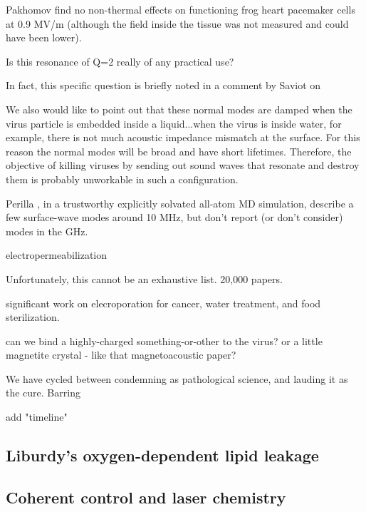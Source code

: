 \documentclass[paper.tex]{subfiles}
\begin{document}
\begin{multicols}{1}
Pakhomov \cite{Comparative} find no non-thermal effects on functioning frog heart pacemaker cells at 0.9 MV/m (although the field inside the tissue was not measured and could have been lower). 



Is this resonance of Q=2 really of any practical use?


In fact, this specific question is briefly noted in a comment by Saviot \cite{Comment2004} on 


\begin{fquote}
	We also would like to point out that these normal modes are damped when the virus particle is embedded inside a liquid...when the virus is inside water, for example, there is not much acoustic impedance mismatch at the surface. For this reason the normal modes will be broad and have short lifetimes. Therefore, the objective of killing viruses by sending out sound waves that resonate and destroy them is probably unworkable in such a configuration.	
\end{fquote}




Perilla \cite{}, in a trustworthy explicitly solvated all-atom MD simulation, describe a few surface-wave modes around 10 MHz, but don't report (or don't consider) modes in the GHz.




electropermeabilization




Unfortunately, this cannot be an exhaustive list. 20,000 papers.

significant work on elecroporation for cancer, water treatment, and food sterilization.


can we bind a highly-charged something-or-other to the virus?
or a little magnetite crystal - like that magnetoacoustic paper?


We have cycled between condemning as pathological science, and lauding it as the cure. Barring 


add "timeline"



\subsection{Liburdy's oxygen-dependent lipid leakage}



\subsection{Coherent control and laser chemistry}



\end{multicols}
\end{document}
